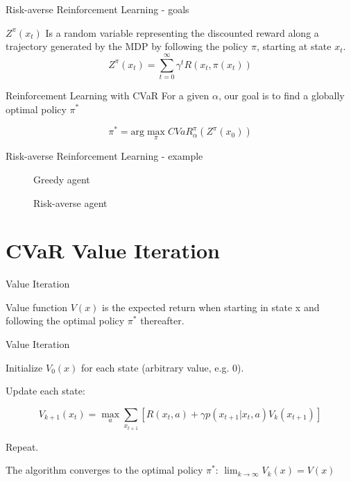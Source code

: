 \documentclass{beamer}
\begin{document}
\begin{frame}{Risk-averse Reinforcement Learning - goals}
\begin{definition}
$Z^\pi(x_t)$ Is a random variable representing the discounted reward along a trajectory generated by the MDP by following the policy $\pi$, starting at state $x_t$.
$$Z^\pi(x_{t})=\sum_{t=0}^\infty \gamma^tR(x_t,\pi(x_t))$$
\end{definition}

\begin{block}{Reinforcement Learning with CVaR}
For a given $\alpha$, our goal is to find a globally optimal policy $\pi^*$

$$\pi^* = \text{arg}\max_\pi CVaR^\pi_\alpha(Z^\pi(x_0))$$
\end{block}
\end{frame}


\begin{frame}{Risk-averse Reinforcement Learning - example}
\begin{figure}
    \centering
    \begin{minipage}{0.5\textwidth}
        \centering
        \caption{Greedy agent}
    \end{minipage}\hfill
    \begin{minipage}{0.5\textwidth}
        \centering
        \caption{Risk-averse agent}
    \end{minipage}
\end{figure}
\end{frame}


\section{CVaR Value Iteration}

\begin{frame}{Value Iteration}

\begin{definition}

Value function $V(x)$ is the expected return when starting in state x and following the optimal policy $\pi^*$ thereafter.

\end{definition}

\begin{block}{Value Iteration}

Initialize $V_0(x)$ for each state (arbitrary value, e.g. 0).

Update each state:

$$V_{k+1}(x_t) = \max_a \sum_{x_{t+1}}\left[ R(x_t, a) +  \gamma p(x_{t+1}|x_t, a) V_k(x_{t+1})\right]$$

Repeat.
\end{block}

The algorithm converges to the optimal policy $\pi^*$: $\lim_{k\to\infty}V_k(x) = V(x)$

\end{frame}
\end{document}
